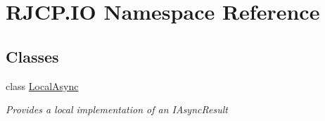\hypertarget{namespace_r_j_c_p_1_1_i_o}{}\section{R\+J\+C\+P.\+IO Namespace Reference}
\label{namespace_r_j_c_p_1_1_i_o}
\subsection*{Classes}
\begin{DoxyCompactItemize}
\item 
class \mbox{\hyperlink{class_r_j_c_p_1_1_i_o_1_1_local_async}{Local\+Async}}
\begin{DoxyCompactList}\small\item\em Provides a local implementation of an I\+Async\+Result \end{DoxyCompactList}\end{DoxyCompactItemize}
